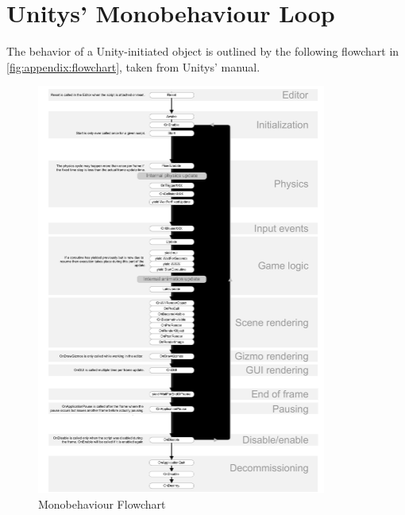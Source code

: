 %

\chapter{Unitys' Monobehaviour Loop}
\label{app:engineloop}

The behavior of a Unity-initiated object is outlined by the following 
flowchart in \ref{fig:appendix:flowchart}, taken from Unitys' manual.

\begin{figure}[htb]
	\centering
	\includegraphics[width=0.85\textwidth]{_external/media/monobehaviour_flowchart.pdf}
	\caption{Monobehaviour Flowchart}
	\label{fig:appendix:monoflow}
\end{figure}